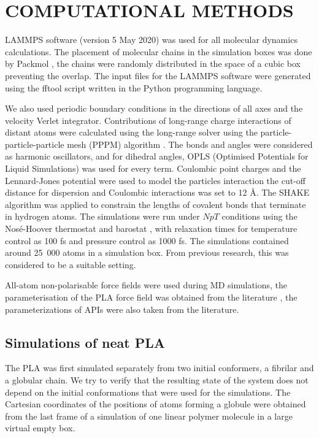 \newpage
\section{COMPUTATIONAL METHODS}


LAMMPS software \cite{thompson_lammps_2022} (version 5 May 2020) was used for all molecular dynamics calculations. The placement of molecular chains in the simulation boxes was done by Packmol \cite{martinez_p_2009}, the chains were randomly distributed in the space of a cubic box preventing the  overlap. The input files for the LAMMPS software were generated using the fftool \cite{fftool} script written in the Python programming language.

We also used periodic boundary conditions in the directions of all axes and the velocity Verlet integrator. Contributions of long-range charge interactions of distant atoms were calculated using the long-range solver using the particle-particle-particle mesh (PPPM) algorithm \cite{hockney_computer_2021}. The bonds and angles were considered as harmonic oscillators, and for dihedral angles, OPLS (Optimised Potentials for Liquid Simulations) was used for every term.  Coulombic point charges and the Lennard-Jones potential were used to model the particles interaction the cut-off distance for dispersion and Coulombic interactions was set to 12 \r{A}. The SHAKE algorithm \cite{ryckaert_numerical_1977} was applied to constrain the lengths of covalent bonds that terminate in hydrogen atoms. The simulations were run under $NpT$ conditions using the Nosé-Hoover thermostat and barostat \cite{tuckerman_liouville-operator_2006}, with relaxation times for temperature control as 100 fs and pressure control as 1000 fs. The simulations contained around 25~000 atoms in a simulation box. From previous research, this was considered to be a suitable setting. \cite{klajmon_glass_2023}

All-atom non-polarisable force fields were used during MD simulations, the parameterisation of the PLA force field was obtained from the literature \cite{mcaliley_development_2011}, the parameterizations of APIs were also taken from the literature. \cite{cervinka_structure_2021}

\subsection{Simulations of neat PLA}
The PLA was first simulated separately from two initial conformers, a fibrilar and a globular chain. We try to verify that the resulting state of the system does not depend on the initial conformations that were used for the simulations. The Cartesian coordinates of the positions of atoms forming a globule were obtained from the last frame of a simulation of one linear polymer molecule in a large virtual empty box.

